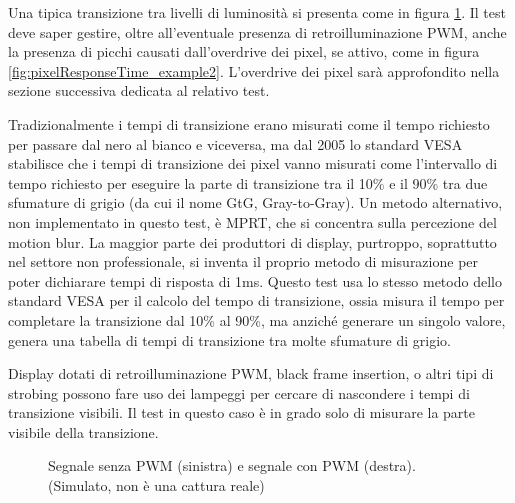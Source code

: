 Una tipica transizione tra livelli di luminosità si presenta come in figura \ref{fig:pixelResponseTime_example1}. Il test deve saper gestire, oltre all'eventuale presenza di retroilluminazione PWM, anche la presenza di picchi causati dall'overdrive dei pixel, se attivo, come in figura \ref{fig:pixelResponseTime_example2}. L'overdrive dei pixel sarà approfondito nella sezione successiva dedicata al relativo test.

Tradizionalmente i tempi di transizione erano misurati come il tempo richiesto per passare dal nero al bianco e viceversa, ma dal 2005 lo standard VESA\cite{vesa_measurementstd} stabilisce che i tempi di transizione dei pixel vanno misurati come l'intervallo di tempo richiesto per eseguire la parte di transizione tra il 10\% e il 90\% tra due sfumature di grigio (da cui il nome GtG, Gray-to-Gray). Un metodo alternativo, non implementato in questo test, è MPRT\cite{mprt}, che si concentra sulla percezione del motion blur. La maggior parte dei produttori di display, purtroppo, soprattutto nel settore non professionale, si inventa il proprio metodo di misurazione per poter dichiarare tempi di risposta di 1ms. Questo test usa lo stesso metodo dello standard VESA per il calcolo del tempo di transizione, ossia misura il tempo per completare la transizione dal 10\% al 90\%, ma anziché generare un singolo valore, genera una tabella di tempi di transizione tra molte sfumature di grigio.

Display dotati di retroilluminazione PWM, black frame insertion, o altri tipi di strobing possono fare uso dei lampeggi per cercare di nascondere i tempi di transizione visibili. Il test in questo caso è in grado solo di misurare la parte visibile della transizione.

\begin{figure}[H]
	\centering
	\caption{Segnale senza PWM (sinistra) e segnale con PWM (destra). (Simulato, non è una cattura reale)}
	\label{fig:pixelResponseTime_example1}
\end{figure}

